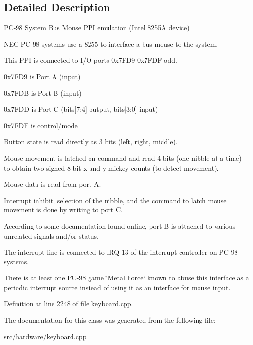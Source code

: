 \subsection{Detailed Description}
P\-C-\/98 System Bus Mouse P\-P\-I emulation (Intel 8255\-A device) 

N\-E\-C P\-C-\/98 systems use a 8255 to interface a bus mouse to the system.

This P\-P\-I is connected to I/\-O ports 0x7\-F\-D9-\/0x7\-F\-D\-F odd.
\begin{DoxyItemize}
\item 0x7\-F\-D9 is Port A (input)
\item 0x7\-F\-D\-B is Port B (input)
\item 0x7\-F\-D\-D is Port C (bits\mbox{[}7\-:4\mbox{]} output, bits\mbox{[}3\-:0\mbox{]} input)
\item 0x7\-F\-D\-F is control/mode
\end{DoxyItemize}

Button state is read directly as 3 bits (left, right, middle).

Mouse movement is latched on command and read 4 bits (one nibble at a time) to obtain two signed 8-\/bit x and y mickey counts (to detect movement).

Mouse data is read from port A.

Interrupt inhibit, selection of the nibble, and the command to latch mouse movement is done by writing to port C.

According to some documentation found online, port B is attached to various unrelated signals and/or status.

The interrupt line is connected to I\-R\-Q 13 of the interrupt controller on P\-C-\/98 systems.

There is at least one P\-C-\/98 game \char`\"{}\-Metal Force\char`\"{} known to abuse this interface as a periodic interrupt source instead of using it as an interface for mouse input. 

Definition at line 2248 of file keyboard.\-cpp.



The documentation for this class was generated from the following file\-:\begin{DoxyCompactItemize}
\item 
src/hardware/keyboard.\-cpp\end{DoxyCompactItemize}
